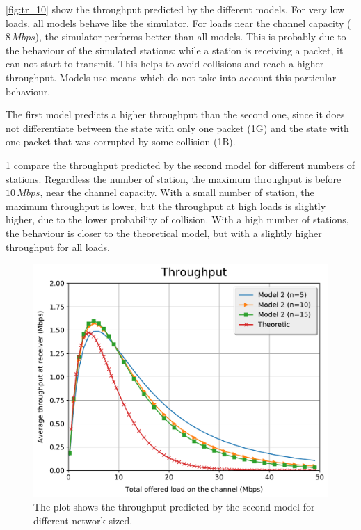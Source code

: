 \cref{fig:tr_10} show the throughput predicted by the different models.
For very low loads, all models behave like the simulator.
For loads near the channel capacity ($8\, Mbps$), the simulator performs better than all models.
This is probably due to the behaviour of the simulated stations:
while a station is receiving a packet, it can not start to transmit.
This helps to avoid collisions and reach a higher throughput.
Models use means which do not take into account this particular behaviour.

The first model predicts a higher throughput than the second one, since it does not differentiate between the state with only one packet (1G) and the state with one packet that was corrupted by some collision (1B).

\cref{fig:tr_1g1b} compare the throughput predicted by the second model for different numbers of stations.
Regardless the number of station, the maximum throughput is before $10\,Mbps$, near the channel capacity.
With a small number of station, the maximum throughput is lower, but the throughput at high loads is slightly higher, due to the lower probability of collision.
With a high number of stations, the behaviour is closer to the theoretical model, but with a slightly higher throughput for all loads.

\begin{figure}[t]
	\centering
	\includegraphics[width=.99\columnwidth]{figures/tr_1g1b}
	\caption{The plot shows the throughput predicted by the second model for different network sized.}
	\label{fig:tr_1g1b}
\end{figure}

